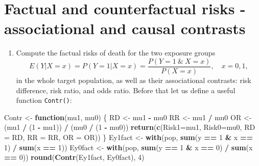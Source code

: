 \documentclass[
]{book}
\newenvironment{Shaded}{\begin{snugshade}}{\end{snugshade}}
\newcommand{\AttributeTok}[1]{\textcolor[rgb]{0.13,0.29,0.53}{#1}}
\newcommand{\ControlFlowTok}[1]{\textcolor[rgb]{0.13,0.29,0.53}{\textbf{#1}}}
\newcommand{\DecValTok}[1]{\textcolor[rgb]{0.00,0.00,0.81}{#1}}
\newcommand{\FunctionTok}[1]{\textcolor[rgb]{0.13,0.29,0.53}{\textbf{#1}}}
\newcommand{\NormalTok}[1]{#1}
\newcommand{\OtherTok}[1]{\textcolor[rgb]{0.56,0.35,0.01}{#1}}
\newcommand{\SpecialCharTok}[1]{\textcolor[rgb]{0.81,0.36,0.00}{\textbf{#1}}}
\providecommand{\tightlist}{%
  \setlength{\itemsep}{0pt}\setlength{\parskip}{0pt}}
\begin{document}
\section{Factual and counterfactual risks - associational and causal contrasts}\label{factual-and-counterfactual-risks---associational-and-causal-contrasts}

\begin{enumerate}
\def\labelenumi{\arabic{enumi}.}
\tightlist
\item
  Compute the factual risks of death for the two exposure groups
  \[ E(Y|X=x) = P(Y=1|X=x) = \frac{P(Y=1\ \&\ X=x)}{P(X=x)},
  \quad x=0,1, \]
  in the whole target population, as well as their
  associational contrasts: risk difference, risk ratio, and odds
  ratio. Before that let us define a useful function \texttt{Contr()}:
\end{enumerate}

\begin{Shaded}
\begin{Highlighting}[]
\NormalTok{Contr }\OtherTok{\textless{}{-}} \ControlFlowTok{function}\NormalTok{(mu1, mu0) \{}
\NormalTok{  RD }\OtherTok{\textless{}{-}}\NormalTok{ mu1 }\SpecialCharTok{{-}}\NormalTok{ mu0}
\NormalTok{  RR }\OtherTok{\textless{}{-}}\NormalTok{ mu1 }\SpecialCharTok{/}\NormalTok{ mu0}
\NormalTok{  OR }\OtherTok{\textless{}{-}}\NormalTok{ (mu1 }\SpecialCharTok{/}\NormalTok{ (}\DecValTok{1} \SpecialCharTok{{-}}\NormalTok{ mu1)) }\SpecialCharTok{/}\NormalTok{ (mu0 }\SpecialCharTok{/}\NormalTok{ (}\DecValTok{1} \SpecialCharTok{{-}}\NormalTok{ mu0))}
  \FunctionTok{return}\NormalTok{(}\FunctionTok{c}\NormalTok{(}\AttributeTok{Risk1=}\NormalTok{mu1, }\AttributeTok{Risk0=}\NormalTok{mu0, }\AttributeTok{RD =}\NormalTok{ RD, }\AttributeTok{RR =}\NormalTok{ RR, }\AttributeTok{OR =}\NormalTok{ OR))}
\NormalTok{\}}
\NormalTok{Ey1fact }\OtherTok{\textless{}{-}} \FunctionTok{with}\NormalTok{(pop, }\FunctionTok{sum}\NormalTok{(y }\SpecialCharTok{==} \DecValTok{1} \SpecialCharTok{\&}\NormalTok{ x }\SpecialCharTok{==} \DecValTok{1}\NormalTok{) }\SpecialCharTok{/} \FunctionTok{sum}\NormalTok{(x }\SpecialCharTok{==} \DecValTok{1}\NormalTok{))}
\NormalTok{Ey0fact }\OtherTok{\textless{}{-}} \FunctionTok{with}\NormalTok{(pop, }\FunctionTok{sum}\NormalTok{(y }\SpecialCharTok{==} \DecValTok{1} \SpecialCharTok{\&}\NormalTok{ x }\SpecialCharTok{==} \DecValTok{0}\NormalTok{) }\SpecialCharTok{/} \FunctionTok{sum}\NormalTok{(x }\SpecialCharTok{==} \DecValTok{0}\NormalTok{))}
\FunctionTok{round}\NormalTok{(}\FunctionTok{Contr}\NormalTok{(Ey1fact, Ey0fact), }\DecValTok{4}\NormalTok{)}
\end{Highlighting}
\end{Shaded}
\end{document}
